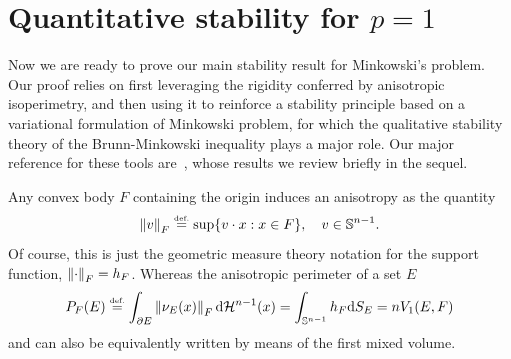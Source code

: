\documentclass[a4paper, 10pt, twoside]{amsart}
\numberwithin{equation}{section}
\theoremstyle{plain}
\theoremstyle{definition}
\begin{document}


\section{Quantitative stability for $p=1$}\label{sec.case_p1}

Now we are ready to prove our main stability result for Minkowski's problem. Our proof relies on first leveraging the rigidity conferred by anisotropic isoperimetry, and then using it to reinforce a stability principle based on a variational formulation of Minkowski problem, for which the qualitative stability theory of the Brunn-Minkowski inequality plays a major role. Our major reference for these tools are~\cite{diskant1972bounds,figalli2010stability}, whose results we review briefly in the sequel. 

Any convex body $F$ containing the origin induces an anisotropy as the quantity 
\[
    \left\lVert v\right\rVert_F 
    \stackrel{\mbox{\upshape\tiny def.}}{=} 
    \mathop{\rm sup} \{v\cdot x: x \in F\}, \quad v\in\mathbb{S}^{n-1}. 
\]
Of course, this is just the geometric measure theory notation for the support function, $\left\lVert\cdot\right\rVert_F = h_F$. Whereas the anisotropic perimeter of a set $E$
\begin{equation}
    P_F(E) \stackrel{\mbox{\upshape\tiny def.}}{=} 
    \int_{\partial E} \left\lVert\nu_E(x)\right\rVert_F{\rm d} \mathcal{H}^{n-1}(x) 
    =
    \int_{\mathbb{S}^{n-1}} h_F {\rm d} S_E = nV_1(E,F)
\end{equation}
and can also be equivalently written by means of the first mixed volume. 
\end{document}
